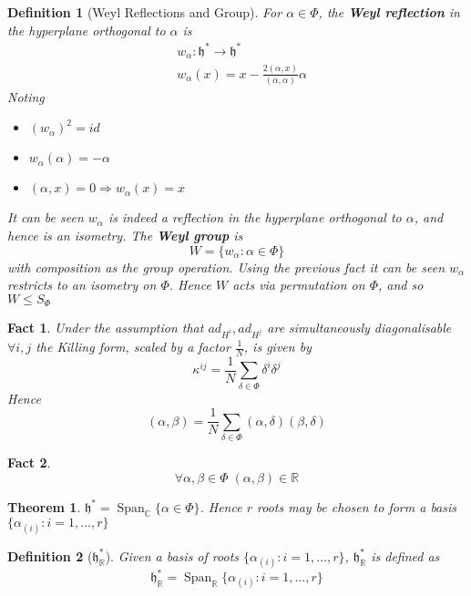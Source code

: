 \documentclass{article}
\newtheorem{theorem}{Theorem}[subsection]
\newtheorem{definition}{Definition}[subsection]
\newtheorem{fact}{Fact}[subsection]
\DeclareMathOperator{\spn}{Span}
\newcommand{\bam}[1]{\textbf{#1}}
\newcommand{\mf}[1]{\mathfrak{#1}}
\newcommand{\mbb}[1]{\mathbb{#1}}
\newcommand{\set}[1]{\lbrace #1 \rbrace}
\begin{document}
\begin{definition}[Weyl Reflections and Group]
For $\alpha\in\Phi$, the \bam{Weyl reflection} in the hyperplane orthogonal to $\alpha$ is 
\begin{align*}
    & w_\alpha : \mf{h}^\ast \to \mf{h}^\ast \\
    & w_\alpha (x) = x - \frac{2(\alpha,x)}{(\alpha,\alpha)}\alpha
\end{align*}
Noting 
\begin{itemize}
    \item $(w_\alpha)^2=id$
    \item $w_\alpha (\alpha) = -\alpha$
    \item $(\alpha,x)=0 \Rightarrow w_\alpha (x) = x$
\end{itemize}
It can be seen $w_\alpha$ is indeed a reflection in the hyperplane orthogonal to $\alpha$, and hence is an isometry. The \bam{Weyl group} is 
\[
W=\set{  w_\alpha : \alpha\in\Phi  }
\]
with composition as the group operation. Using the previous fact it can be seen $w_\alpha$ restricts to an isometry on $\Phi$. Hence $W$ acts via permutation on $\Phi$, and so $W\leq S_\Phi$
\end{definition}

\begin{fact}
Under the assumption that $ad_{H^i}, ad_{H^j}$ are simultaneously diagonalisable $\forall i,j$ the Killing form, scaled by a factor $\frac{1}{N}$, is given by 
\[
\kappa^{ij}=\frac{1}{N} \sum_{\delta\in\Phi} \delta^i\delta^j
\]
Hence 
\[
(\alpha, \beta)= \frac{1}{N}\sum_{\delta\in\Phi} (\alpha, \delta) (\beta, \delta)
\]
\end{fact}

\begin{fact}
\[
\forall \alpha, \beta\in\Phi \; (\alpha, \beta)\in\mbb{R}
\]
\end{fact}

\begin{theorem}
$\mf{h}^\ast=\spn_\mbb{C}\lbrace \alpha\in\Phi \rbrace$. Hence $r$ roots may be chosen to form a basis $\lbrace \alpha_{(i)} : i=1,\dots,r \rbrace$
\end{theorem}

\begin{definition}[$\mf{h}^\ast_\mbb{R}$]
Given a basis of roots $\set{  \alpha_{(i)} : i=1,\dots,r  }$, $\mf{h}^\ast_\mbb{R}$ is defined as 
\[
\mf{h}^\ast_\mbb{R} = \spn_\mbb{R} \set{  \alpha_{(i)} : i=1,\dots,r  }
\]
\end{definition}
\end{document}
